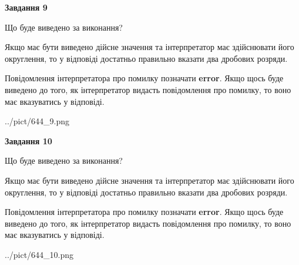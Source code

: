 \documentclass[12pt, ukrainian]{article}
\begin{document}
{\begin {Large}
{\begin {center}\textbf{Завдання 9}\end {center}}\par
Що буде виведено за виконання? \par

Якщо має бути виведено дійсне значення та інтерпретатор має здійснювати його округлення, 
то у відповіді достатньо правильно вказати два дробових розряди.

Повідомлення інтерпретатора про помилку позначати \textbf{error}.
Якщо щось буде виведено до того, як інтерпретатор видасть повідомлення про помилку, 
то воно має вказуватись у відповіді. \par

\begin{center}
	{../pict/644_9.png}
\end{center}
\newpage

{\begin {center}\textbf{Завдання 10}\end {center}}\par
Що буде виведено за виконання? \par

Якщо має бути виведено дійсне значення та інтерпретатор має здійснювати його округлення, 
то у відповіді достатньо правильно вказати два дробових розряди.

Повідомлення інтерпретатора про помилку позначати \textbf{error}.
Якщо щось буде виведено до того, як інтерпретатор видасть повідомлення про помилку, 
то воно має вказуватись у відповіді. \par

\begin{center}
	{../pict/644_10.png}
\end{center}
\newpage

\end {Large}}
\end{document}
